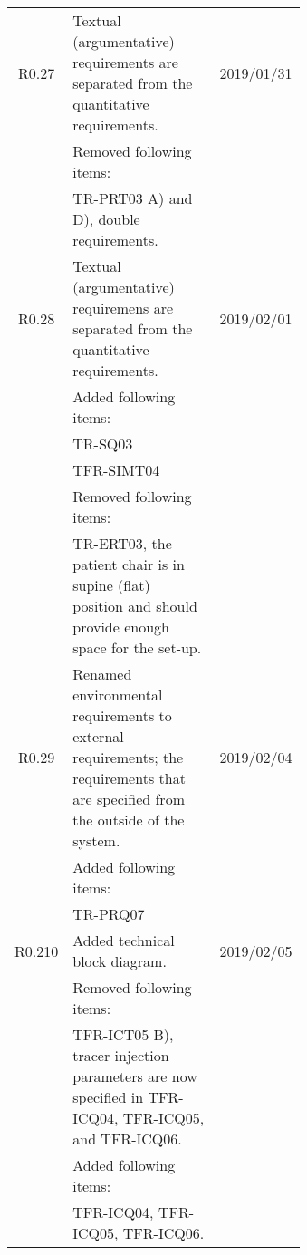 \begin{longtable}{|c|p{0.64\linewidth}|l|}
		 	R0.27 & Textual (argumentative) requirements are separated from the quantitative requirements. & 2019/01/31 \\
		 	& Removed following items: & \\
		 	& \hspace{0.5cm} \textbullet TR-PRT03 A) and D), double requirements. & \\
		 	R0.28 & Textual (argumentative) requiremens are separated from the quantitative requirements. & 2019/02/01 \\
		 	& Added following items: & \\
		 	& \hspace{0.5cm} \textbullet TR-SQ03 & \\
		 	& \hspace{0.5cm} \textbullet TFR-SIMT04 & \\
		 	& Removed following items: & \\
		 	& \hspace{0.5cm} \textbullet TR-ERT03, the patient chair is in supine (flat) position and should provide enough space for the set-up. & \\
		 	R0.29 & Renamed environmental requirements to external requirements; the requirements that are specified from the outside of the system.  & 2019/02/04 \\
		 	& Added following items: & \\
		 	& \hspace{0.5cm} \textbullet TR-PRQ07 & \\
		 	R0.210 & Added technical block diagram. & 2019/02/05 \\
		 	& Removed following items: & \\
		 	& \hspace{0.5cm} \textbullet TFR-ICT05 B), tracer injection parameters are now specified in TFR-ICQ04, TFR-ICQ05, and TFR-ICQ06. &\\
		 	& Added following items: & \\
		 	& \hspace{0.5cm} \textbullet TFR-ICQ04, TFR-ICQ05, TFR-ICQ06. & \\
		\hline
\end{longtable}

\newpage

